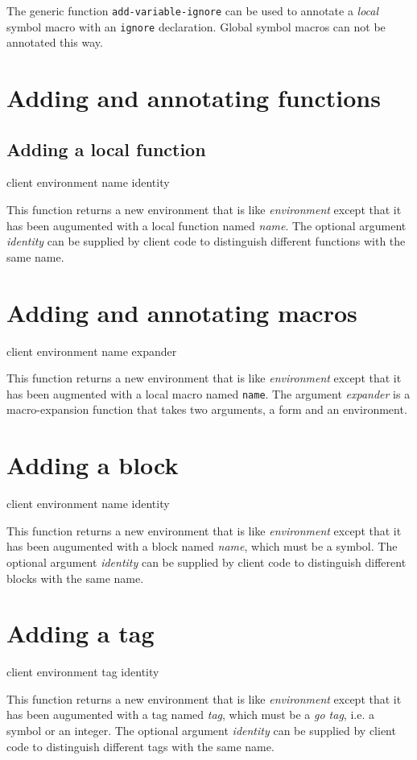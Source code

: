 The generic function \texttt{add-variable-ignore}
 can be used to annotate
a \emph{local} symbol macro with an \texttt{ignore} declaration.
Global symbol macros can not be annotated this way.

\section{Adding and annotating functions}

\subsection{Adding a local function}

{\footnotesize
{} {client environment name \optional identity}
}

This function returns a new environment that is like
\textit{environment} except that it has been augumented with a local
function named \textit{name}.  The optional argument \textit{identity}
can be supplied by client code to distinguish different functions with
the same name.

\section{Adding and annotating macros}

{\footnotesize
{} {client environment name expander}
}

This function returns a new environment that is like
\textit{environment} except that it has been augmented with a local
macro named \texttt{name}.  The argument \textit{expander} is a
macro-expansion function that takes two arguments, a form and an
environment.

\section{Adding a block}

{\footnotesize
{} {client environment name \optional identity}
}

This function returns a new environment that is like
\textit{environment} except that it has been augumented with a block
named \textit{name}, which must be a symbol.  The optional argument
\textit{identity} can be supplied by client code to distinguish
different blocks with the same name.

\section{Adding a tag}

{\footnotesize
{} {client environment tag \optional identity}
}

This function returns a new environment that is like
\textit{environment} except that it has been augumented with a tag
named \textit{tag}, which must be a \emph{go tag}, i.e. a symbol or an
integer.  The optional argument \textit{identity} can be supplied by
client code to distinguish different tags with the same name.
